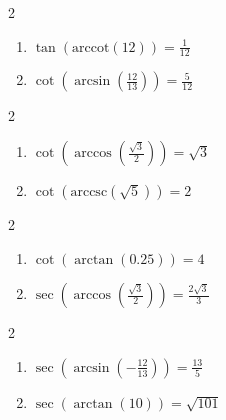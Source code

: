 \documentclass{ximera}
\begin{document}
\begin{multicols}{2}

\begin{enumerate}

\setcounter{enumi}{\value{HW}}

\item  $\tan\left(\text{arccot}\left( 12  \right)\right) = \frac{1}{12}$ 
\item  $\cot\left(\arcsin\left(\frac{12}{13}\right)\right) = \frac{5}{12}$

\setcounter{HW}{\value{enumi}}

\end{enumerate}

\end{multicols}

\begin{multicols}{2}

\begin{enumerate}

\setcounter{enumi}{\value{HW}}

\item  $\cot\left(\arccos\left(\frac{\sqrt{3}}{2}\right)\right) = \sqrt{3}$
\item  $\cot\left(\text{arccsc}\left(\sqrt{5}\right)\right) = 2$ 

\setcounter{HW}{\value{enumi}}

\end{enumerate}

\end{multicols}

\begin{multicols}{2}

\begin{enumerate}

\setcounter{enumi}{\value{HW}}

\item  $\cot\left(\arctan \left( 0.25 \right)\right) = 4$ 
\item  $\sec\left(\arccos\left(\frac{\sqrt{3}}{2}\right)\right) = \frac{2\sqrt{3}}{3}$

\setcounter{HW}{\value{enumi}}

\end{enumerate}

\end{multicols}

\begin{multicols}{2}

\begin{enumerate}

\setcounter{enumi}{\value{HW}}

\item  $\sec\left(\arcsin\left(-\frac{12}{13}\right)\right) = \frac{13}{5}$
\item  $\sec\left(\arctan\left(10\right)\right) = \sqrt{101}$ 

\setcounter{HW}{\value{enumi}}

\end{enumerate}

\end{multicols}
\end{document}
